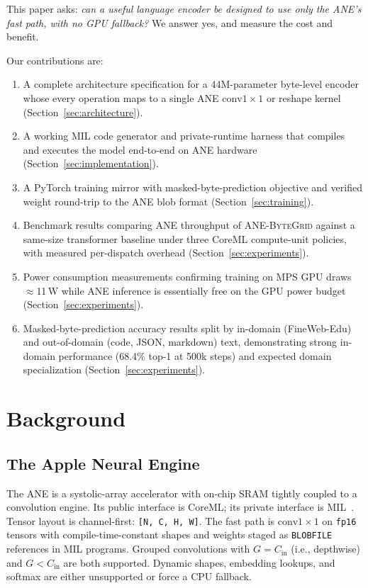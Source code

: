\documentclass[10pt,twocolumn]{article}
\newcommand{\bytegrid}{\textsc{ANE-ByteGrid}}
\begin{document}
This paper asks: \emph{can a useful language encoder be designed to
use only the ANE's fast path, with no GPU fallback?}
We answer yes, and measure the cost and benefit.

Our contributions are:
\begin{enumerate}
  \item A complete architecture specification for a 44M-parameter byte-level
    encoder whose every operation maps to a single ANE $\text{conv}1{\times}1$
    or reshape kernel (Section~\ref{sec:architecture}).
  \item A working MIL code generator and private-runtime harness that compiles
    and executes the model end-to-end on ANE hardware
    (Section~\ref{sec:implementation}).
  \item A PyTorch training mirror with masked-byte-prediction objective and
    verified weight round-trip to the ANE blob format
    (Section~\ref{sec:training}).
  \item Benchmark results comparing ANE throughput of \bytegrid{} against
    a same-size transformer baseline under three CoreML compute-unit
    policies, with measured per-dispatch overhead
    (Section~\ref{sec:experiments}).
  \item Power consumption measurements confirming training on MPS GPU
    draws $\approx$11\,W while ANE inference is essentially free on the
    GPU power budget (Section~\ref{sec:experiments}).
  \item Masked-byte-prediction accuracy results split by in-domain
    (FineWeb-Edu) and out-of-domain (code, JSON, markdown) text,
    demonstrating strong in-domain performance (68.4\% top-1 at 500k steps)
    and expected domain specialization (Section~\ref{sec:experiments}).
\end{enumerate}

\section{Background}
\label{sec:background}

\subsection{The Apple Neural Engine}

The ANE is a systolic-array accelerator with on-chip SRAM tightly coupled
to a convolution engine.
Its public interface is CoreML; its private interface is MIL~\cite{TODO_coreml_tools}.
Tensor layout is channel-first: \texttt{[N,\,C,\,H,\,W]}.
The fast path is $\text{conv}1{\times}1$ on \texttt{fp16} tensors with
compile-time-constant shapes and weights staged as \texttt{BLOBFILE}
references in MIL programs.
Grouped convolutions with $G = C_\text{in}$ (i.e., depthwise) and
$G < C_\text{in}$ are both supported.
Dynamic shapes, embedding lookups, and softmax are either unsupported or
force a CPU fallback.
\end{document}
